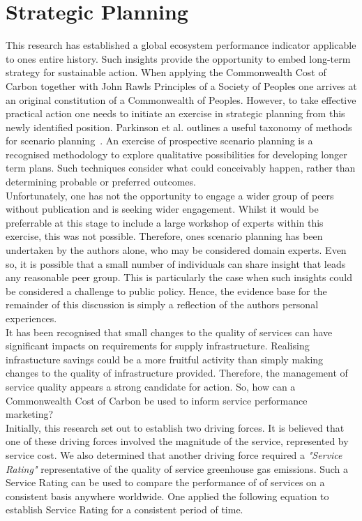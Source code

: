 \documentclass[11pt, oneside]{article}   	%
\begin{document}
\section{Strategic Planning}

This research has established a global ecosystem performance indicator applicable to ones entire history.
Such insights provide the opportunity to embed long-term strategy for sustainable action.
When applying the Commonwealth Cost of Carbon together with John Rawls Principles of a Society of Peoples one arrives at an original constitution of a Commonwealth of Peoples.
However, to take effective practical action one needs to initiate an exercise in strategic planning from this newly identified position.
Parkinson et al. outlines a useful taxonomy of methods for scenario planning~\cite{atp1}.
An exercise of prospective scenario planning is a recognised methodology to explore qualitative possibilities for developing longer term plans.
Such techniques consider what could conceivably happen, rather than determining probable or preferred outcomes.\\

Unfortunately, one has not the opportunity to engage a wider group of peers without publication and is seeking wider engagement.
Whilst it would be preferrable at this stage to include a large workshop of experts within this exercise, this was not possible.
Therefore, ones scenario planning has been undertaken by the authors alone, who may be considered domain experts.
Even so, it is possible that a small number of individuals can share insight that leads any reasonable peer group.
This is particularly the case when such insights could be considered a challenge to public policy.
Hence, the evidence base for the remainder of this discussion is simply a reflection of the authors personal experiences.\\

It has been recognised that small changes to the quality of services can have significant impacts on requirements for supply infrastructure.
Realising infrastucture savings could be a more fruitful activity than simply making changes to the quality of infrastructure provided.
Therefore, the management of service quality appears a strong candidate for action.
So, how can a Commonwealth Cost of Carbon be used to inform service performance marketing?\\

Initially, this research set out to establish two driving forces.
It is believed that one of these driving forces involved the magnitude of the service, represented by service cost.
We also determined that another driving force required a \emph{"Service Rating"} representative of the quality of service greenhouse gas emissions.
Such a Service Rating can be used to compare the performance of of services on a consistent basis anywhere worldwide.
One applied the following equation to establish Service Rating for a consistent period of time.\\
\end{document}
